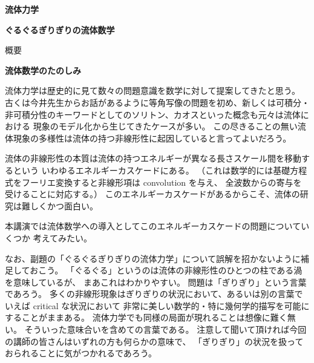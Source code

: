 \documentclass[uplatex,dvipdfmx]{jlreq}
\begin{document}
\begin{center}
  \vspace*{20pt}
  {\Huge\bfseries 流体力学}

  \vspace{1pc}
  {\Large\bfseries ぐるぐるぎりぎりの流体数学}

  \vspace{1pc}
  {\Large 概要}
\end{center}

\vfill

\newpage

\begin{center}
  {\Large\bfseries 流体数学のたのしみ}
\end{center}

\bigskip
\hspace*{\fill}{\large\bfseries 木村　芳文（名古屋大・多元数理）}

\bigskip

流体力学は歴史的に見て数々の問題意識を数学に対して提案してきたと思う。
古くは今井先生からお話があるように等角写像の問題を初め、新しくは可積分・
非可積分性のキーワードとしてのソリトン、カオスといった概念も元々は流体における
現象のモデル化から生じてきたケースが多い。
この尽きることの無い流体現象の多様性は流体の持つ非線形性に起因していると言ってよいだろう。

流体の非線形性の本質は流体の持つエネルギーが異なる長さスケール間を移動するという
いわゆるエネルギーカスケードにある。
（これは数学的には基礎方程式をフーリエ変換すると非線形項は convolution を与え、
全波数からの寄与を受けることに対応する。）
このエネルギーカスケードがあるからこそ、流体の研究は難しくかつ面白い。

本講演では流体数学への導入としてこのエネルギーカスケードの問題についていくつか
考えてみたい。

なお、副題の「ぐるぐるぎりぎりの流体力学」について誤解を招かないように補足しておこう。
「ぐるぐる」というのは流体の非線形性のひとつの柱である渦を意味しているが、
まあこれはわかりやすい。
問題は「ぎりぎり」という言葉であろう。
多くの非線形現象はぎりぎりの状況において、あるいは別の言葉でいえば critical な状況において
非常に美しい数学的・特に幾何学的描写を可能にすることがままある。
流体力学でも同様の局面が現れることは想像に難く無い。
そういった意味合いを含めての言葉である。
注意して聞いて頂ければ今回の講師の皆さんはいずれの方も何らかの意味で、
「ぎりぎり」の状況を扱っておられることに気がつかれるであろう。
\end{document}
